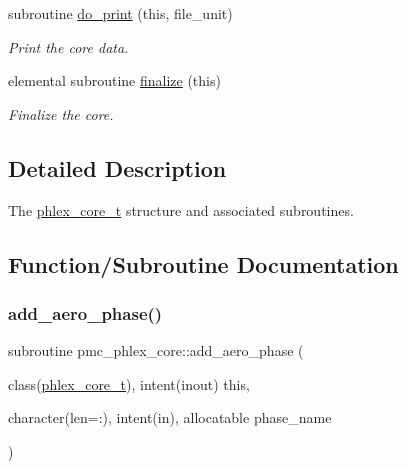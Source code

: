 \begin{DoxyCompactItemize}
subroutine \mbox{\hyperlink{namespacepmc__phlex__core_a06f496bd886df92d34a981c082eecdb3}{do\+\_\+print}} (this, file\+\_\+unit)
\begin{DoxyCompactList}\small\item\em Print the core data. \end{DoxyCompactList}\item 
elemental subroutine \mbox{\hyperlink{namespacepmc__phlex__core_adc400294fd57d72328a0914e31dd3836}{finalize}} (this)
\begin{DoxyCompactList}\small\item\em Finalize the core. \end{DoxyCompactList}\end{DoxyCompactItemize}


\subsection{Detailed Description}
The \mbox{\hyperlink{structpmc__phlex__core_1_1phlex__core__t}{phlex\+\_\+core\+\_\+t}} structure and associated subroutines. 

\subsection{Function/\+Subroutine Documentation}
\mbox{\label{namespacepmc__phlex__core_a0451072e828ba667d94da371f6651304}} 
\subsubsection{\texorpdfstring{add\+\_\+aero\+\_\+phase()}{add\_aero\_phase()}}
{\footnotesize\ttfamily subroutine pmc\+\_\+phlex\+\_\+core\+::add\+\_\+aero\+\_\+phase (\begin{DoxyParamCaption}\item[{class(\mbox{\hyperlink{structpmc__phlex__core_1_1phlex__core__t}{phlex\+\_\+core\+\_\+t}}), intent(inout)}]{this,  }\item[{character(len=\+:), intent(in), allocatable}]{phase\+\_\+name }\end{DoxyParamCaption})\hspace{0.3cm}{\ttfamily [private]}}



